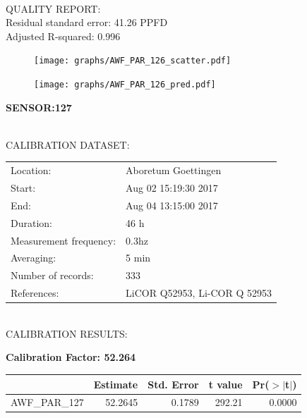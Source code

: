 \documentclass[oneside]{report}
\begin{document}
\hrulefill\\
QUALITY REPORT:\\
Residual standard error: 41.26 PPFD\\
Adjusted R-squared: 0.996



\begin{figure}[H]
  \centering
  \texttt{[image: graphs/AWF\_PAR\_126\_scatter.pdf]}
\end{figure}




\begin{figure}[H]
  \centering
  \texttt{[image: graphs/AWF\_PAR\_126\_pred.pdf]}
\end{figure}

\pagebreak


\begin{center}
\large{\textbf{SENSOR:127}}\\
\end{center}

\hrulefill\\
CALIBRATION DATASET:\\
\begin{table}[h!]
  \centering
  \label{tab:table1}
  \begin{tabular}{ll}
    Location: & Aboretum Goettingen\\ 
    
    
    Start:  & Aug 02 15:19:30 2017 \\
    End:   & Aug 04 13:15:00 2017\\ 
    Duration: & 46 h\\
    Measurement frequency: & 0.3hz\\
    Averaging:  &5 min\\
    Number of records: & 333 \\
    References: & LiCOR Q52953, Li-COR Q 52953 \\
  \end{tabular}
\end{table}

\hrulefill\\
CALIBRATION RESULTS:\\


\begin{center}
\textbf{\large{Calibration Factor: 52.264}}\\
\end{center}
\begin{table}[ht]
\centering
\begin{tabular}{rrrrr}
  \hline
 & Estimate & Std. Error & t value & Pr($>$$|$t$|$) \\ 
  \hline
AWF\_PAR\_127 & 52.2645 & 0.1789 & 292.21 & 0.0000 \\ 
   \hline
\end{tabular}
\end{table}
\end{document}
